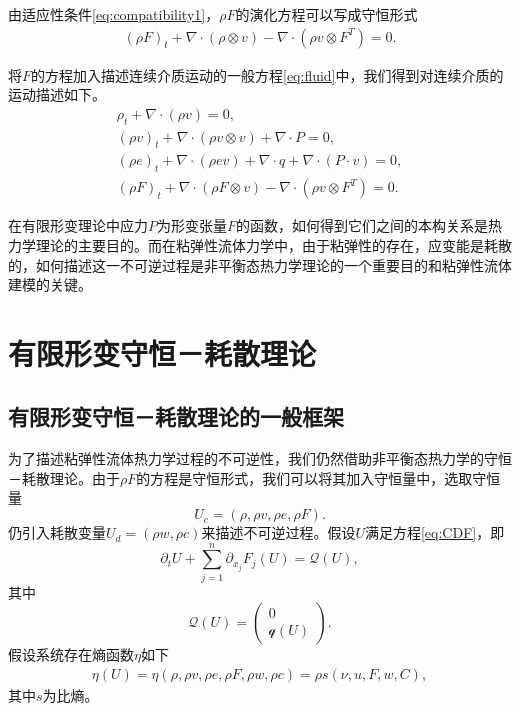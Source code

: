 由适应性条件\eqref{eq:compatibility1}，$\rho F$的演化方程可以写成守恒形式
\begin{eqnarray*}
(\rho F)_t + \nabla \cdot (\rho \otimes v) - \nabla \cdot (\rho v \otimes F^T) = 0 .
\end{eqnarray*} 

将$F$的方程加入描述连续介质运动的一般方程\eqref{eq:fluid}中，我们得到对连续介质的运动描述如下。
\begin{subequations}\label{eq:continuum}
\begin{align}
\rho_t + \nabla \cdot (\rho v )=0, \\
(\rho v)_t + \nabla \cdot (\rho v \otimes v) + \nabla \cdot P = 0, \\
(\rho e)_t + \nabla \cdot (\rho e v) + \nabla \cdot q + \nabla \cdot (P \cdot v) = 0 ,\\
(\rho F)_t + \nabla \cdot (\rho F \otimes v) - \nabla \cdot (\rho v \otimes F^T) = 0 .
\end{align}
\end{subequations}

在有限形变理论中应力$P$为形变张量$F$的函数，如何得到它们之间的本构关系是热力学理论的主要目的。而在粘弹性流体力学中，由于粘弹性的存在，应变能是耗散的，如何描述这一不可逆过程是非平衡态热力学理论的一个重要目的和粘弹性流体建模的关键。

\section{有限形变守恒－耗散理论}
\subsection{有限形变守恒－耗散理论的一般框架}
为了描述粘弹性流体热力学过程的不可逆性，我们仍然借助非平衡态热力学的守恒－耗散理论。由于$\rho F$的方程是守恒形式，我们可以将其加入守恒量中，选取守恒量
$$U_c = (\rho, \rho v, \rho e, \rho F).$$
仍引入耗散变量$U_d = (\rho w,\rho c)$来描述不可逆过程。假设$U$满足方程\eqref{eq:CDF}，即
\begin{equation}\label{eq:FCDF}
		\partial_t U + \sum_{j=1}^n \partial_{x_j} F_j(U) = \mathcal{Q} (U) ,
\end{equation}
其中
\begin{equation*}
	\mathcal{Q}(U) = \left( \begin{matrix}
		0 \\ \mathcal{q}(U)
	\end{matrix} \right).
\end{equation*}
假设系统存在熵函数$\eta$如下
\begin{eqnarray*}
\eta(U) = \eta(\rho, \rho v, \rho e,\rho F,\rho w, \rho c) = \rho s(\nu,u,F,w,C),
\end{eqnarray*}
其中$s$为比熵。

